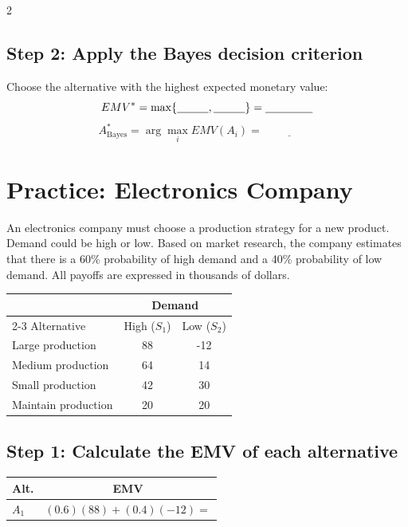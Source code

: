 \begin{multicols}{2}
		\subsection*{Step 2: Apply the Bayes decision criterion}
		Choose the alternative with the highest expected monetary value:\vspace{-2mm}
		\[
		EMV^*
		=
		\max\{
		\underline{\hspace{1cm}},
		\underline{\hspace{1cm}}
		\}
		=
		\underline{\hspace{1.5cm}}
		\]
		\[
		A^*_{\mathrm{Bayes}}
		=
		\arg\max_i EMV(A_i)
		=
		\underline{\hspace{2cm}}
		\]
		
		 
		\section{Practice: Electronics Company}
		
		An electronics company must choose a production strategy for a new
		product. Demand could be high or low. Based on market research,
		the company estimates that there is a 60\% probability of high demand
		and a 40\% probability of low demand. All payoffs are expressed in
		thousands of dollars. \vspace{-2mm}
		
		\begin{center}
			\renewcommand{\arraystretch}{1.3}
			\small
			\begin{tabular}{lcc}
				\toprule
				& \multicolumn{2}{c}{Demand} \\
				\cmidrule(lr){2-3}
				Alternative & High ($S_1$) & Low ($S_2$) \\
				\midrule
				Large production   & 88 & -12 \\
				Medium production  & 64 & 14 \\
				Small production   & 42 & 30 \\
				Maintain production & 20 & 20 \\
				\bottomrule
			\end{tabular}
		\end{center}
		
		\subsection*{Step 1: Calculate the EMV of each alternative}
		
		\begin{center}
			\renewcommand{\arraystretch}{1.5}
			\small
			\begin{tabular}{lc}
				\toprule
				Alt. & EMV \\
				\midrule
				$A_1$
				&
				$(0.6)(88)+(0.4)(-12)
				=$
				\underline{\hspace{1.2cm}}
				\\[4pt]
				

\end{tabular}
\end{center}
\end{multicols}
